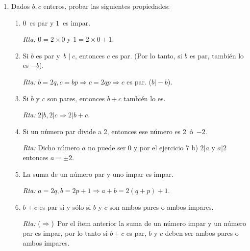 \documentclass[a4paper,12pt,twoside,spanish,reqno]{amsbook}
\numberwithin{equation}{section}
\newcommand{\rta}{\noindent\textit{Rta: }}
\begin{document}
\begin{enumerate}
\begin{enumerate}
    \rta Como $b=aq$ y $c=ap$, $b\pm c=a(q\pm p)$.
    
    \item Si $a \neq 0$, $a | b$\, y \,$a | (b+c)$, entonces \,$a | c$.
    
    \rta Se puede usar el inciso anterior con $b=0$.
    
    \item Si $a \neq 0$\, y \,$a | b$, entonces \,$a| b\cdot c$.
    
    \rta Si $b=aq$ entonces $b.c=aqc \Rightarrow a\vert b.c$.
\end{enumerate}



\item Dados $b,c$ enteros, probar las siguientes propiedades:
\begin{enumerate}
    \item  $0$\, es par y $1$\, es impar.
    
    \rta $0=2\times 0$ y $1=2\times 0+1$.
    
    \item  Si $b$ es par y \,$b \mid c$, entonces $c$ es par.  (Por lo tanto, si $b$ es par, tambi\'en lo es $-b$).
    
    \rta $b=2q, c=bp\Rightarrow c=2qp \Rightarrow c$ es par. ($b\vert -b$).
    
    \item  Si $b$ y $c$ son pares, entonces $b+c$ tambi\'en lo es. %
    
    \rta $2\vert b, 2\vert c \Rightarrow 2\vert b+c$.
    
    \item  Si un número par divide a 2, entonces ese número es 2\, \'o \,$-2$.
    
    \rta Dicho número $a$ no puede ser 0 y por el ejercicio 7 b) $2\vert a$ y $a\vert 2$ entonces $a= \pm2$.
    
    \item  La suma de un número par y uno impar es impar.
    
    \rta $a=2q, b=2p+1 \Rightarrow a+b=2(q+p)+1$.
    
    \item $b + c$ es par si y  sólo si $b$ y $c$ son ambos pares o ambos impares.
    
    \rta ($\Rightarrow$)\, Por el ítem anterior la suma de un número impar y un número par es impar, por lo tanto si $b+c$ es par, $b$ y $c$ deben ser ambos pares o ambos impares.
    

\end{enumerate}
\end{enumerate}
\end{document}
